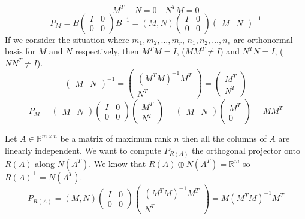 $$
M^T - N = 0 \quad N^T M = 0
$$
$$
P_M = B\begin{pmatrix}
I & 0 \\
0 & 0
\end{pmatrix}B^{-1} = (M, N)\begin{pmatrix}
I & 0 \\
0 & 0
\end{pmatrix}\begin{pmatrix}
M & N
\end{pmatrix}^{-1}
$$
If we consider the situation where $m_1, m_2, \ldots, m_r$, $n_1, n_2, \ldots, n_s$ are orthonormal basis for $M$ and $N$ respectively, then
$ M^TM = I$, ($MM^T \neq I$) and $N^TN = I$, ($NN^T \neq I$).
$$
\begin{pmatrix}
    M & N
\end{pmatrix}^{-1} = \begin{pmatrix}
    (M^TM)^{-1}M^T \\
    N^T
\end{pmatrix} = \begin{pmatrix}
    M^T \\
    N^T
\end{pmatrix}
$$
$$
P_M = \begin{pmatrix}
    M & N
\end{pmatrix}\begin{pmatrix}
    I & 0 \\
    0 & 0
\end{pmatrix}\begin{pmatrix}
    M^T \\
    N^T
\end{pmatrix} = \begin{pmatrix}
    M & N
\end{pmatrix}\begin{pmatrix}
    M^T \\
    0
\end{pmatrix} = MM^T
$$

Let $A \in \mathbb{R}^{m \times n}$ be a matrix of maximum rank $n$ then all the columns of $A$ are linearly independent.
We want to compute $P_{R(A)}$ the orthogonal projector onto $R(A)$ along $N(A^T)$. We know that $R(A) \oplus N(A^T) = \mathbb{R}^m$ so $R(A)^{\perp} = N(A^T)$.
$$ P_{R(A)} = (M, N)\begin{pmatrix}
    I & 0 \\
    0 & 0
    \end{pmatrix}\begin{pmatrix}
        (M^TM)^{-1}M^T \\
        N^T
    \end{pmatrix} = M(M^TM)^{-1}M^T $$

